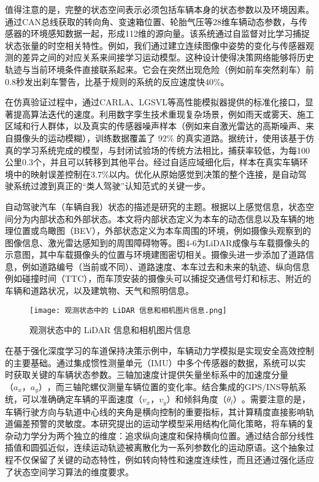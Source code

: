 值得注意的是，完整的状态空间表示必须包括车辆本身的状态参数以及环境因素。通过CAN总线获取的转向角、变速箱位置、轮胎气压等28维车辆动态参数，与传感器的环境感知数据一起，形成112维的源向量。该系统通过自监督对比学习捕捉状态张量的时空相关特性。例如，我们通过建立连续图像中姿势的变化与传感器观测的差异之间的对应关系来间接学习运动模型。这种设计使得决策网络能够将历史轨迹与当前环境条件直接联系起来。它会在突然出现危险（例如前车突然刹车）前0.8秒发出刹车警告，比基于规则的系统的反应速度快40\%。

在仿真验证过程中，通过CARLA、LGSVL等高性能模拟器提供的标准化接口，显著提高算法迭代的速度。利用数字孪生技术重现复杂场景，例如雨天或雾天、施工区域和行人群体，以及真实的传感器噪声样本（例如来自激光雷达的高斯噪声、来自摄像头的运动模糊），训练数据覆盖了 92\% 的真实道路。据统计，使用该基于仿真的学习系统完成的模型，与封闭试验场的传统方法相比，捕获率较低，为每100公里0.3个，并且可以转移到其他平台。经过自适应域细化后，样本在真实车辆环境中的映射误差控制在3.7\%以内。优化从原始感觉到决策的整个连接，是自动驾驶系统过渡到真正的“类人驾驶”认知范式的关键一步。


自动驾驶汽车（车辆自我）状态的描述是研究的主题。根据以上感觉信息，状态空间分为内部状态和外部状态。本文将内部状态定义为本车的动态信息以及车辆的地理位置或鸟瞰图（BEV），外部状态定义为本车周围的环境，例如摄像头观察到的图像信息、激光雷达感知到的周围障碍物等。图4-6为LiDAR成像与车载摄像头的示意图，其中车载摄像头的位置与环境建图密切相关。摄像头进一步添加了道路信息，例如道路编号（当前或不同）、道路速度、本车过去和未来的轨迹、纵向信息例如碰撞时间（TTC），而车顶安装的摄像头可以捕捉交通信号灯和标志、附近的车辆和道路状况，以及建筑物、天气和照明信息。

\begin{figure}[hbt]
	\centering
	\texttt{[image: 观测状态中的 LiDAR 信息和相机图片信息.png]}
	\caption{观测状态中的 LiDAR 信息和相机图片信息}
	\label{f.example}
\end{figure}

在基于强化深度学习的车道保持决策示例中，车辆动力学模拟是实现安全高效控制的主要基础。通过集成惯性测量单元（IMU）中多个传感器的数据，系统可以实时获取关键的车辆状态参数。三轴加速度计提供矢量坐标系中的加速度分量\(（a_x，a_y）\)，而三轴陀螺仪测量车辆位置的变化率。结合集成的GPS/INS导航系统，可以准确确定车辆的平面速度\(（v_x，v_y）\)和倾斜角度\(（θ_l）\)。需要注意的是，车辆行驶方向与轨道中心线的夹角是横向控制的重要指标，其计算精度直接影响轨道偏差预警的灵敏度。本研究提出的运动学模型采用结构化简化策略，将车辆的复杂动力学分为两个独立的维度：追求纵向速度和保持横向位置。通过结合部分线性插值和圆弧近似，连续运动轨迹被离散化为一系列参数化的运动原语。这个抽象过程不仅保留了关键的动态特性，例如转向特性和速度连续性，而且还通过强化适应了状态空间学习算法的维度要求。

